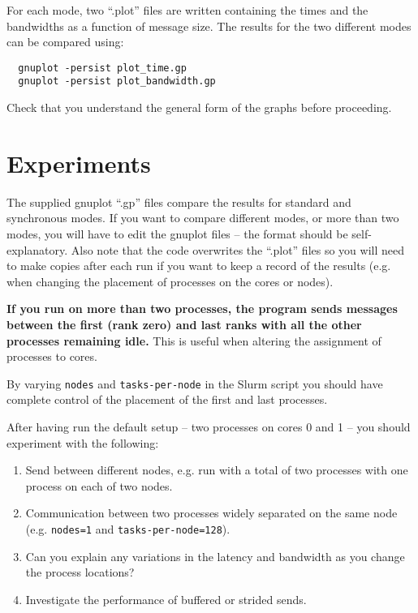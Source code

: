\documentclass{article}
\begin{document}
For each mode, two ``.plot'' files are written containing the times and
the bandwidths as a function of message size. The results for the two
different modes can be compared using:

\begin{verbatim}
  gnuplot -persist plot_time.gp
  gnuplot -persist plot_bandwidth.gp
\end{verbatim}

Check that you understand the general form of the graphs before
proceeding.

\section{Experiments}

The supplied gnuplot ``.gp'' files compare the results for standard and
synchronous modes. If you want to compare different modes, or more than
two modes, you will have to edit the gnuplot files -- the format should
be self-explanatory. Also note that the code overwrites the ``.plot''
files so you will need to make copies after each run if you want to keep
a record of the results (e.g. when changing the placement of processes
on the cores or nodes).

{\bf If you run on more than two processes, the program sends messages
  between the first (rank zero) and last ranks with all the other
  processes remaining idle.} This is useful when altering the
assignment of processes to cores.

By varying \verb+nodes+ and \verb+tasks-per-node+ in the Slurm script
you should have complete control of the placement of the first and
last processes.

After having run the default setup -- two processes on cores 0 and 1
-- you should experiment with the following:

\begin{enumerate}

\item Send between different nodes, e.g. run with a total of two
  processes with one process on each of two nodes.

\item Communication between two processes widely separated on the same
  node (e.g.  \verb+nodes=1+ and \verb+tasks-per-node=128+).

\item Can you explain any variations in the latency and bandwidth
  as you change the process locations?

\item Investigate the performance of buffered or strided sends.

\end{enumerate}
\end{document}
